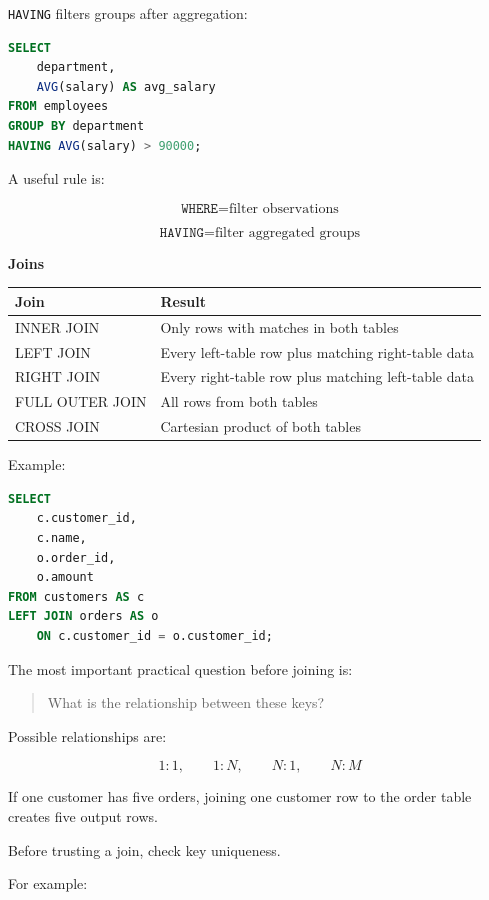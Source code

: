 \documentclass[11pt,letterpaper]{article}
\begin{document}
\texttt{HAVING} filters groups after aggregation:

\begin{lstlisting}[language=SQL]
SELECT
    department,
    AVG(salary) AS avg_salary
FROM employees
GROUP BY department
HAVING AVG(salary) > 90000;
\end{lstlisting}

A useful rule is:

\[
\texttt{WHERE}
=
\text{filter observations}
\]

\[
\texttt{HAVING}
=
\text{filter aggregated groups}
\]


\textbf{Joins}

\begin{center}
\begin{tabularx}{\textwidth}{lX}
\toprule
Join & Result \\
\midrule
INNER JOIN & Only rows with matches in both tables \\
LEFT JOIN & Every left-table row plus matching right-table data \\
RIGHT JOIN & Every right-table row plus matching left-table data \\
FULL OUTER JOIN & All rows from both tables \\
CROSS JOIN & Cartesian product of both tables \\
\bottomrule
\end{tabularx}
\end{center}

Example:

\begin{lstlisting}[language=SQL]
SELECT
    c.customer_id,
    c.name,
    o.order_id,
    o.amount
FROM customers AS c
LEFT JOIN orders AS o
    ON c.customer_id = o.customer_id;
\end{lstlisting}

The most important practical question before joining is:

\begin{quote}
What is the relationship between these keys?
\end{quote}

Possible relationships are:

\[
1:1,\qquad 1:N,\qquad N:1,\qquad N:M
\]

If one customer has five orders, joining one customer row to the order table
creates five output rows.

Before trusting a join, check key uniqueness.

For example:
\end{document}
